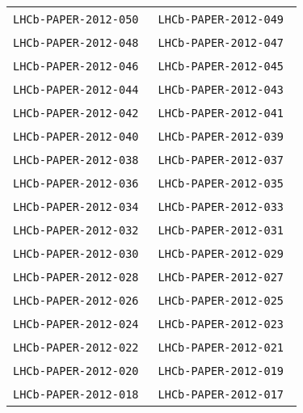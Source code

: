 \begin{center}
\begin{longtable}{ll}
\texttt{LHCb-PAPER-2012-050}~\cite{LHCb-PAPER-2012-050} & 
\texttt{LHCb-PAPER-2012-049}~\cite{LHCb-PAPER-2012-049} \\
\texttt{LHCb-PAPER-2012-048}~\cite{LHCb-PAPER-2012-048} & 
\texttt{LHCb-PAPER-2012-047}~\cite{LHCb-PAPER-2012-047} \\
\texttt{LHCb-PAPER-2012-046}~\cite{LHCb-PAPER-2012-046} & 
\texttt{LHCb-PAPER-2012-045}~\cite{LHCb-PAPER-2012-045} \\
\texttt{LHCb-PAPER-2012-044}~\cite{LHCb-PAPER-2012-044} & 
\texttt{LHCb-PAPER-2012-043}~\cite{LHCb-PAPER-2012-043} \\
\texttt{LHCb-PAPER-2012-042}~\cite{LHCb-PAPER-2012-042} & 
\texttt{LHCb-PAPER-2012-041}~\cite{LHCb-PAPER-2012-041} \\
\texttt{LHCb-PAPER-2012-040}~\cite{LHCb-PAPER-2012-040} & 
\texttt{LHCb-PAPER-2012-039}~\cite{LHCb-PAPER-2012-039} \\
\texttt{LHCb-PAPER-2012-038}~\cite{LHCb-PAPER-2012-038} & 
\texttt{LHCb-PAPER-2012-037}~\cite{LHCb-PAPER-2012-037} \\
\texttt{LHCb-PAPER-2012-036}~\cite{LHCb-PAPER-2012-036} & 
\texttt{LHCb-PAPER-2012-035}~\cite{LHCb-PAPER-2012-035} \\
\texttt{LHCb-PAPER-2012-034}~\cite{LHCb-PAPER-2012-034} & 
\texttt{LHCb-PAPER-2012-033}~\cite{LHCb-PAPER-2012-033} \\
\texttt{LHCb-PAPER-2012-032}~\cite{LHCb-PAPER-2012-032} & 
\texttt{LHCb-PAPER-2012-031}~\cite{LHCb-PAPER-2012-031} \\
\texttt{LHCb-PAPER-2012-030}~\cite{LHCb-PAPER-2012-030} & 
\texttt{LHCb-PAPER-2012-029}~\cite{LHCb-PAPER-2012-029} \\
\texttt{LHCb-PAPER-2012-028}~\cite{LHCb-PAPER-2012-028} & 
\texttt{LHCb-PAPER-2012-027}~\cite{LHCb-PAPER-2012-027} \\
\texttt{LHCb-PAPER-2012-026}~\cite{LHCb-PAPER-2012-026} & 
\texttt{LHCb-PAPER-2012-025}~\cite{LHCb-PAPER-2012-025} \\
\texttt{LHCb-PAPER-2012-024}~\cite{LHCb-PAPER-2012-024} & 
\texttt{LHCb-PAPER-2012-023}~\cite{LHCb-PAPER-2012-023} \\
\texttt{LHCb-PAPER-2012-022}~\cite{LHCb-PAPER-2012-022} & 
\texttt{LHCb-PAPER-2012-021}~\cite{LHCb-PAPER-2012-021} \\
\texttt{LHCb-PAPER-2012-020}~\cite{LHCb-PAPER-2012-020} & 
\texttt{LHCb-PAPER-2012-019}~\cite{LHCb-PAPER-2012-019} \\
\texttt{LHCb-PAPER-2012-018}~\cite{LHCb-PAPER-2012-018} & 
\texttt{LHCb-PAPER-2012-017}~\cite{LHCb-PAPER-2012-017} \\

\end{longtable}
\end{center}
